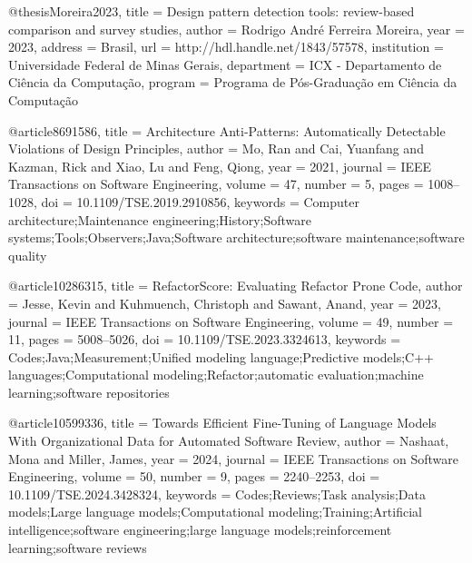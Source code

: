 @thesis{Moreira2023,
title = {Design pattern detection tools: review-based comparison and survey studies},
author = {Rodrigo André Ferreira Moreira},
year = 2023,
address = {Brasil},
url = {http://hdl.handle.net/1843/57578},
institution = {Universidade Federal de Minas Gerais},
department = {ICX - Departamento de Ciência da Computação},
program = {Programa de Pós-Graduação em Ciência da Computação}
}

@article{8691586,
title = {Architecture Anti-Patterns: Automatically Detectable Violations of Design Principles},
author = {Mo, Ran and Cai, Yuanfang and Kazman, Rick and Xiao, Lu and Feng, Qiong},
year = 2021,
journal = {IEEE Transactions on Software Engineering},
volume = 47,
number = 5,
pages = {1008--1028},
doi = {10.1109/TSE.2019.2910856},
keywords = {Computer architecture;Maintenance engineering;History;Software systems;Tools;Observers;Java;Software architecture;software maintenance;software quality}
}

@article{10286315,
title = {RefactorScore: Evaluating Refactor Prone Code},
author = {Jesse, Kevin and Kuhmuench, Christoph and Sawant, Anand},
year = 2023,
journal = {IEEE Transactions on Software Engineering},
volume = 49,
number = 11,
pages = {5008--5026},
doi = {10.1109/TSE.2023.3324613},
keywords = {Codes;Java;Measurement;Unified modeling language;Predictive models;C++ languages;Computational modeling;Refactor;automatic evaluation;machine learning;software repositories}
}

@article{10599336,
title = {Towards Efficient Fine-Tuning of Language Models With Organizational Data for Automated Software Review},
author = {Nashaat, Mona and Miller, James},
year = 2024,
journal = {IEEE Transactions on Software Engineering},
volume = 50,
number = 9,
pages = {2240--2253},
doi = {10.1109/TSE.2024.3428324},
keywords = {Codes;Reviews;Task analysis;Data models;Large language models;Computational modeling;Training;Artificial intelligence;software engineering;large language models;reinforcement learning;software reviews}
}

